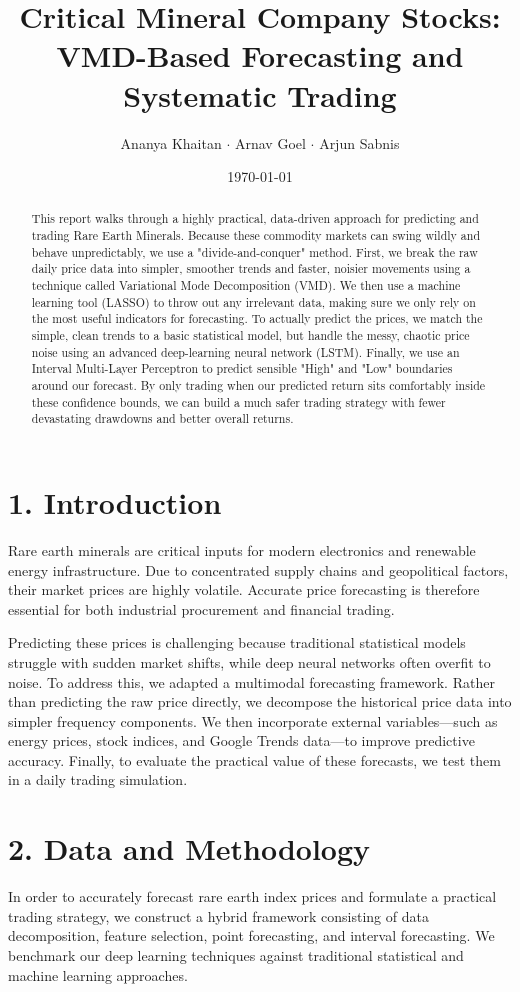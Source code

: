 \documentclass[11pt,a4paper]{article}
\title{\textbf{Critical Mineral Company Stocks:\\ VMD-Based Forecasting and Systematic Trading}}
\author{Ananya Khaitan $\cdot$ Arnav Goel $\cdot$ Arjun Sabnis}
\date{\today}
\begin{document}
\maketitle

\begin{abstract}
This report walks through a highly practical, data-driven approach for predicting and trading Rare Earth Minerals. Because these commodity markets can swing wildly and behave unpredictably, we use a "divide-and-conquer" method. First, we break the raw daily price data into simpler, smoother trends and faster, noisier movements using a technique called Variational Mode Decomposition (VMD). We then use a machine learning tool (LASSO) to throw out any irrelevant data, making sure we only rely on the most useful indicators for forecasting. To actually predict the prices, we match the simple, clean trends to a basic statistical model, but handle the messy, chaotic price noise using an advanced deep-learning neural network (LSTM). Finally, we use an Interval Multi-Layer Perceptron to predict sensible "High" and "Low" boundaries around our forecast. By only trading when our predicted return sits comfortably inside these confidence bounds, we can build a much safer trading strategy with fewer devastating drawdowns and better overall returns.
\end{abstract}

\section{1. Introduction}
Rare earth minerals are critical inputs for modern electronics and renewable energy infrastructure. Due to concentrated supply chains and geopolitical factors, their market prices are highly volatile. Accurate price forecasting is therefore essential for both industrial procurement and financial trading.

Predicting these prices is challenging because traditional statistical models struggle with sudden market shifts, while deep neural networks often overfit to noise. To address this, we adapted a multimodal forecasting framework. Rather than predicting the raw price directly, we decompose the historical price data into simpler frequency components. We then incorporate external variables—such as energy prices, stock indices, and Google Trends data—to improve predictive accuracy. Finally, to evaluate the practical value of these forecasts, we test them in a daily trading simulation.

\section{2. Data and Methodology}
In order to accurately forecast rare earth index prices and formulate a practical trading strategy, we construct a hybrid framework consisting of data decomposition, feature selection, point forecasting, and interval forecasting. We benchmark our deep learning techniques against traditional statistical and machine learning approaches.
\end{document}

